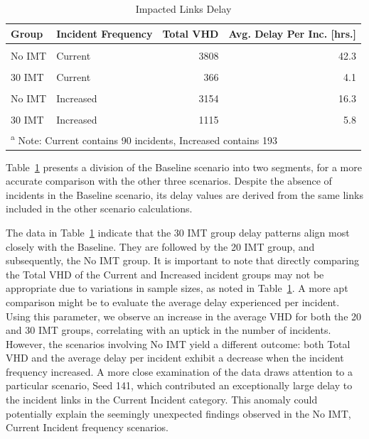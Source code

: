 \documentclass[fancy, oneside, mastersfancy, ms]{byuthesis}
\begin{document}
\hypertarget{tbl-impacted-links}{}
\begin{table}
\caption{\label{tbl-impacted-links}Impacted Links Delay }\tabularnewline

\centering
\begin{tabular}[t]{llrr}
\toprule
\textbf{Group} & \textbf{Incident Frequency} & \textbf{Total VHD} & \textbf{Avg. Delay Per Inc. [hrs.]}\\
\midrule
\cellcolor{gray!6}{Baseline} & \cellcolor{gray!6}{Current} & \cellcolor{gray!6}{326} & \cellcolor{gray!6}{3.6}\\
No IMT & Current & 3808 & 42.3\\
\cellcolor{gray!6}{20 IMT} & \cellcolor{gray!6}{Current} & \cellcolor{gray!6}{723} & \cellcolor{gray!6}{8.0}\\
30 IMT & Current & 366 & 4.1\\
\cellcolor{gray!6}{Baseline} & \cellcolor{gray!6}{Increased} & \cellcolor{gray!6}{540} & \cellcolor{gray!6}{2.8}\\
\addlinespace
No IMT & Increased & 3154 & 16.3\\
\cellcolor{gray!6}{20 IMT} & \cellcolor{gray!6}{Increased} & \cellcolor{gray!6}{1645} & \cellcolor{gray!6}{8.5}\\
30 IMT & Increased & 1115 & 5.8\\
\bottomrule
\multicolumn{4}{l}{\textsuperscript{a} Note: Current contains 90 incidents, Increased contains 193}\\
\end{tabular}
\end{table}

Table~\ref{tbl-impacted-links} presents a division of the Baseline
scenario into two segments, for a more accurate comparison with the
other three scenarios. Despite the absence of incidents in the Baseline
scenario, its delay values are derived from the same links included in
the other scenario calculations.

The data in Table~\ref{tbl-impacted-links} indicate that the 30 IMT
group delay patterns align most closely with the Baseline. They are
followed by the 20 IMT group, and subsequently, the No IMT group. It is
important to note that directly comparing the Total VHD of the Current
and Increased incident groups may not be appropriate due to variations
in sample sizes, as noted in Table~\ref{tbl-impacted-links}. A more apt
comparison might be to evaluate the average delay experienced per
incident. Using this parameter, we observe an increase in the average
VHD for both the 20 and 30 IMT groups, correlating with an uptick in the
number of incidents. However, the scenarios involving No IMT yield a
different outcome: both Total VHD and the average delay per incident
exhibit a decrease when the incident frequency increased. A more close
examination of the data draws attention to a particular scenario, Seed
141, which contributed an exceptionally large delay to the incident
links in the Current Incident category. This anomaly could potentially
explain the seemingly unexpected findings observed in the No IMT,
Current Incident frequency scenarios.
\end{document}

